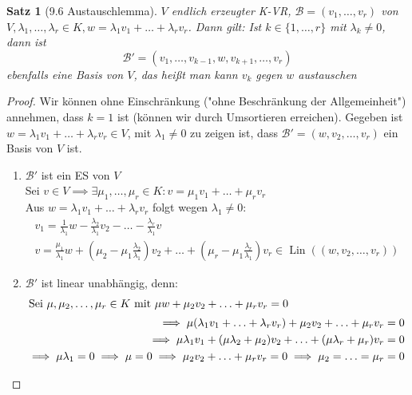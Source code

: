 \documentclass[a4paper]{scrartcl}
\DeclareMathOperator{\Exists}{\exists}
\DeclareMathOperator{\Lin}{Lin}
\theoremstyle{definition}
\theoremstyle{plain}
\newtheorem{thm}{Satz}
\theoremstyle{plain}
\theoremstyle{remark}
\theoremstyle{remark}
\theoremstyle{remark}
\theoremstyle{remark}
\theoremstyle{remark}
\begin{document}
\begin{thm}[9.6 Austauschlemma]
$V$ endlich erzeugter K-VR, $\mathcal{B} = (v_1, \ldots, v_r)$ von $V,\lambda_1, \ldots,\lambda_r \in K,w = \lambda_1 v_1 + \ldots + \lambda_r v_r$. Dann gilt:
Ist $k\in \{1,\ldots, r\}$ mit $\lambda_k \neq 0$, dann ist
\[\mathcal{B}' = (v_1, \ldots, v_{k - 1}, w, v_{k + 1}, \ldots, v_r)\]
ebenfalls eine Basis von $V$, das heißt man kann $v_k$ gegen $w$ austauschen
\end{thm}
\begin{proof}
Wir können ohne Einschränkung ("ohne Beschränkung der Allgemeinheit") annehmen, dass $k = 1$ ist (können wir durch Umsortieren erreichen). Gegeben ist $w = \lambda_1 v_1 + \ldots + \lambda_r v_r \in V$, mit $\lambda_1 \neq 0$
zu zeigen ist, dass $\mathcal{B}' = (w, v_2, \ldots, v_r)$ ein Basis von $V$ ist.
\begin{enumerate}
\item $\mathcal{B}'$ ist ein ES von $V$ \\
         Sei $v\in V \implies \Exists \mu_1, \ldots, \mu_r \in K: v = \mu_1 v_1 + \ldots + \mu_r v_r$ \\
         Aus $w = \lambda_1 v_1 + \ldots + \lambda_r v_r$ folgt wegen $\lambda_1 \neq 0$:
\begin{align*}
v_1 = \frac{1}{\lambda_1} w - \frac{\lambda_2}{\lambda_1} v_2 - \ldots - \frac{\lambda_r}{\lambda_1} v \\
v =\frac{\mu_1}{\lambda_1} w + (\mu_2 - \mu_1 \frac{\lambda_2}{\lambda_1}) v_2 + \ldots + (\mu_r - \mu_1 \frac{\lambda_r}{\lambda_1}) v_r \in \Lin ((w, v_2, \ldots, v_r))
\end{align*}
\item $\mathcal{B}'$ ist linear unabhängig, denn: \\
\begin{align*}
\intertext{Sei $\mu, \mu_2, \ldots, \mu_r \in K$ mit $\mu w + \mu_2 v_2 + \ldots + \mu_r v_r = 0$}
\implies \mu(\lambda_1 v_1 + \ldots + \lambda_r v_r) + \mu_2 v_2 + \ldots + \mu_r v_r = 0 \\
\implies \mu \lambda_1 v_1 + (\mu \lambda_2 + \mu_2) v_2 + \ldots + (\mu \lambda_r + \mu_r) v_r = 0 \\
\implies \mu \lambda_1 = 0 \implies \mu = 0 \implies \mu_2 v_2 + \ldots + \mu_r v_r = 0 \implies \mu_2 = \ldots = \mu_r = 0
\end{align*}
\end{enumerate}
\end{proof}
\end{document}
